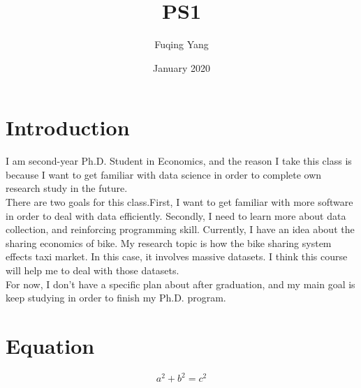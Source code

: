 \documentclass{article}
\title{PS1}
\author{Fuqing Yang }
\date{January 2020}
\begin{document}
\maketitle

\section{Introduction}
I am second-year Ph.D. Student in Economics, and the reason I take this class is because I want to get familiar with data science in order to complete own research study in the future.\\
There are two goals for this class.First, I want to get familiar with more software in order to deal with data efficiently. Secondly, I need to learn more about data collection, and reinforcing programming skill.
Currently, I have an idea about the sharing economics of bike. My research topic is how the bike sharing system effects taxi market. In this case, it involves  massive datasets. I think this course will help me to deal with those datasets.\\
For now, I don't have a specific plan about after graduation, and my main goal is keep studying in order to finish my Ph.D. program.


\section{Equation}
\begin{equation}
 a^2+b^2=c^2   
\end{equation}
\end{document}
